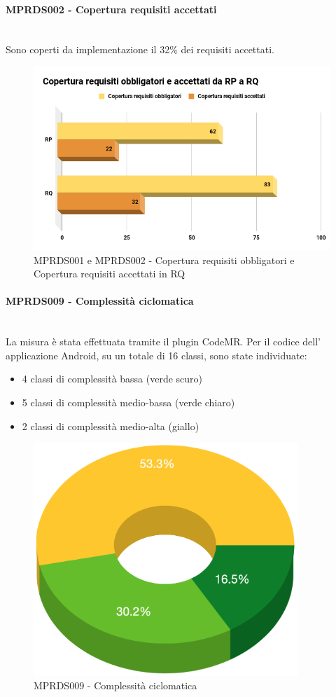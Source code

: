 \paragraph{MPRDS002 - Copertura requisiti accettati}\mbox{}\\[0.4cm]
Sono coperti da implementazione il 32\% dei requisiti accettati.
\begin{figure}[H]
	\centering
	\includegraphics[width=13cm,keepaspectratio]{../includes/pics/Copertura.png}
	\caption{\label{fig:mission}MPRDS001 e MPRDS002 - Copertura requisiti obbligatori e Copertura requisiti accettati in RQ}
\end{figure}
\paragraph{MPRDS009 - Complessità ciclomatica}\mbox{}\\[0.4cm]
La misura è stata effettuata tramite il plugin CodeMR. Per il codice dell' applicazione Android, su un totale di 16 classi, sono state individuate: \begin{itemize}
	\item 4 classi di complessità bassa (verde scuro)
	\item 5 classi di complessità medio-bassa (verde chiaro)
	\item 2 classi di complessità medio-alta (giallo)
\end{itemize}
\begin{figure}[H]
	\centering
	\includegraphics[width=10cm,keepaspectratio]{../includes/pics/complex.png}
	\caption{\label{fig:mission}MPRDS009 - Complessità ciclomatica}
\end{figure}
